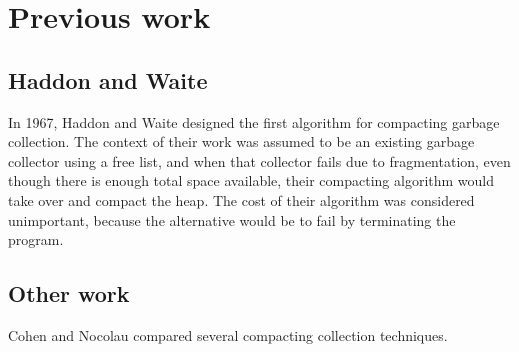 \section{Previous work}

\subsection{Haddon and Waite}

In 1967, Haddon and Waite \cite{Haddon:1967} designed the first
algorithm for compacting garbage collection.  The context of their
work was assumed to be an existing garbage collector using a free
list, and when that collector fails due to fragmentation, even though
there is enough total space available, their compacting algorithm
would take over and compact the heap.  The cost of their algorithm was
considered unimportant, because the alternative would be to fail by
terminating the program.

\subsection{Other work}

Cohen and Nocolau \cite{Cohen:1983:CCA:69575.357226} compared several
compacting collection techniques.
